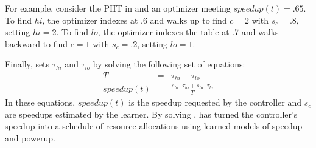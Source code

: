 For example, consider the PHT in  and an optimizer
meeting $speedup(t) = .65$.  To find $hi$, the optimizer indexes at .6
and walks up to find $c=2$ with $s_c=.8$, setting $hi = 2$.  To find
$lo$, the optimizer indexes the table at .7 and walks backward to find
$c=1$ with $s_c=.2$, setting $lo = 1$.

Finally, \SYSTEM{} sets $\tau_{hi}$ and $\tau_{lo}$ by solving the
following set of equations:
\begin{eqnarray}
  T &=& \tau_{hi} + \tau_{lo}    \label{eqn:s1} \\
  speedup(t) &=& \frac{s_{hi} \cdot \tau_{hi} + s_{lo} \cdot \tau_{lo}}{T} \label{eqn:s2}
\end{eqnarray}
In these equations, $speedup(t)$ is the speedup requested by the
controller and $s_c$ are speedups estimated by the learner.  By
solving , \SYSTEM{} has turned the controller's
speedup into a schedule of resource allocations using learned models
of speedup and powerup.

